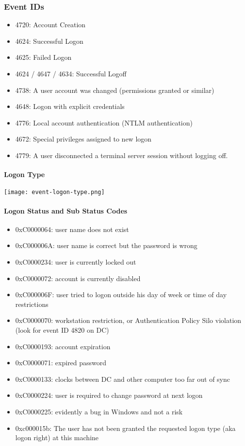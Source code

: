 \subsubsection{Event IDs}
\begin{itemize}
  \item 4720: Account Creation
  \item 4624: Successful Logon
  \item 4625: Failed Logon
  \item 4624 / 4647 / 4634: Successful Logoff
  \item 4738: A user account was changed (permissions granted or similar)
  \item 4648: Logon with explicit credentials
  \item 4776: Local account authentication (NTLM authentication)
  \item 4672: Special privileges assigned to new logon
  \item 4779: A user disconnected a terminal server session without logging off.
\end{itemize}

\paragraph{Logon Type}
\texttt{[image: event-logon-type.png]}

\paragraph{Logon Status and Sub Status Codes}
\begin{itemize}
  \item 0xC0000064: user name does not exist
  \item 0xC000006A: user name is correct but the password is wrong
  \item 0xC0000234: user is currently locked out
  \item 0xC0000072: account is currently disabled
  \item 0xC000006F: user tried to logon outside his day of week or time of day restrictions
  \item 0xC0000070: workstation restriction, or Authentication Policy Silo violation (look for event ID 4820 on DC)
  \item 0xC0000193: account expiration
  \item 0xC0000071: expired password
  \item 0xC0000133: clocks between DC and other computer too far out of sync
  \item 0xC0000224: user is required to change password at next logon
  \item 0xC0000225: evidently a bug in Windows and not a risk
  \item 0xc000015b: The user has not been granted the requested logon type (aka logon right) at this machine
\end{itemize}

